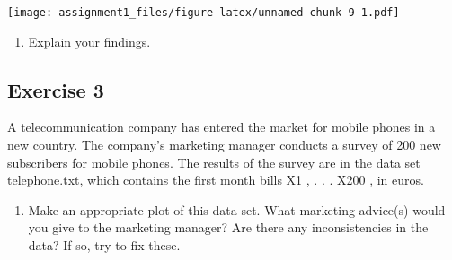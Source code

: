 \documentclass[
]{article}
\newenvironment{Shaded}{\begin{snugshade}}{\end{snugshade}}
\newcommand{\AttributeTok}[1]{\textcolor[rgb]{0.77,0.63,0.00}{#1}}
\newcommand{\CommentTok}[1]{\textcolor[rgb]{0.56,0.35,0.01}{\textit{#1}}}
\newcommand{\ConstantTok}[1]{\textcolor[rgb]{0.00,0.00,0.00}{#1}}
\newcommand{\FunctionTok}[1]{\textcolor[rgb]{0.00,0.00,0.00}{#1}}
\newcommand{\NormalTok}[1]{#1}
\newcommand{\OtherTok}[1]{\textcolor[rgb]{0.56,0.35,0.01}{#1}}
\newcommand{\SpecialCharTok}[1]{\textcolor[rgb]{0.00,0.00,0.00}{#1}}
\newcommand{\StringTok}[1]{\textcolor[rgb]{0.31,0.60,0.02}{#1}}
\providecommand{\tightlist}{%
  \setlength{\itemsep}{0pt}\setlength{\parskip}{0pt}}
\begin{document}
\texttt{[image: assignment1\_files/figure-latex/unnamed-chunk-9-1.pdf]}

\begin{enumerate}
\def\labelenumi{\alph{enumi})}
\setcounter{enumi}{3}
\tightlist
\item
  Explain your findings.
\end{enumerate}

\hypertarget{exercise-3}{%
\subsection{Exercise 3}\label{exercise-3}}

A telecommunication company has entered the market for mobile phones in
a new country. The company's marketing manager conducts a survey of 200
new subscribers for mobile phones. The results of the survey are in the
data set telephone.txt, which contains the first month bills X1 , . . .
X200 , in euros.

\begin{enumerate}
\def\labelenumi{\alph{enumi})}
\tightlist
\item
  Make an appropriate plot of this data set. What marketing advice(s)
  would you give to the marketing manager? Are there any inconsistencies
  in the data? If so, try to fix these.
\end{enumerate}

\begin{Shaded}
\end{Shaded}
\end{document}
